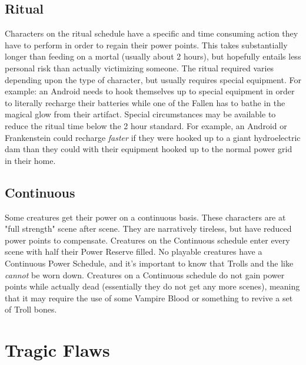 \subsection{Ritual}

\hspace{\parindent} Characters on the ritual schedule have a specific and time consuming action they have to perform in order to regain their power points. This takes substantially longer than feeding on a mortal (usually about 2 hours), but hopefully entails less personal risk than actually victimizing someone. The ritual required varies depending upon the type of character, but usually requires special equipment. For example: an Android needs to hook themselves up to special equipment in order to literally recharge their batteries while one of the Fallen has to bathe in the magical glow from their artifact. Special circumstances may be available to reduce the ritual time below the 2 hour standard. For example, an Android or Frankenstein could recharge \textit{faster} if they were hooked up to a giant hydroelectric dam than they could with their equipment hooked up to the normal power grid in their home.

\subsection{Continuous}

\hspace{\parindent} Some creatures get their power on a continuous basis. These characters are at "full strength" scene after scene. They are narratively tireless, but have reduced power points to compensate. Creatures on the Continuous schedule enter every scene with half their Power Reserve filled. No playable creatures have a Continuous Power Schedule, and it's important to know that Trolls and the like \textit{cannot} be worn down. Creatures on a Continuous schedule do not gain power points while actually dead (essentially they do not get any more scenes), meaning that it may require the use of some Vampire Blood or something to revive a set of Troll bones.

\section{Tragic Flaws}

